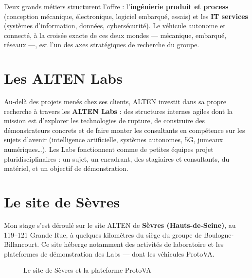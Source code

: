 Deux grands métiers structurent l'offre : l'\textbf{ingénierie produit et
process} (conception mécanique, électronique, logiciel embarqué, essais) et les
\textbf{IT services} (systèmes d'information, données, cybersécurité). Le
véhicule autonome et connecté, à la croisée exacte de ces deux mondes ---
mécanique, embarqué, réseaux ---, est l'un des axes stratégiques de recherche
du groupe.

\section{Les ALTEN Labs}

Au-delà des projets menés chez ses clients, ALTEN investit dans sa propre
recherche à travers les \textbf{ALTEN Labs} : des structures internes agiles
dont la mission est d'explorer les technologies de rupture, de construire des
démonstrateurs concrets et de faire monter les consultants en compétence sur
les sujets d'avenir (intelligence artificielle, systèmes autonomes, 5G,
jumeaux numériques\ldots). Les Labs fonctionnent comme de petites équipes
projet pluridisciplinaires : un sujet, un encadrant, des stagiaires et
consultants, du matériel, et un objectif de démonstration.


\section{Le site de Sèvres}

Mon stage s'est déroulé sur le site ALTEN de \textbf{Sèvres (Hauts-de-Seine)},
au 119--121 Grande Rue, à quelques kilomètres du siège du groupe de
Boulogne-Billancourt. Ce site héberge notamment des activités de laboratoire
et les plateformes de démonstration des Labs --- dont les véhicules ProtoVA.

\begin{figure}[ht]
  \centering
  \hfill
  \caption{Le site de Sèvres et la plateforme ProtoVA}
\end{figure}

